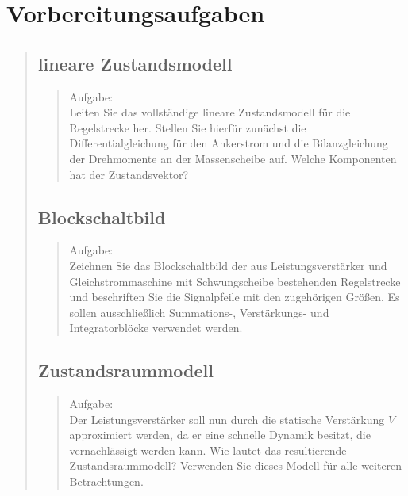 \section{Vorbereitungsaufgaben}
\begin{quote}
	\subsection{lineare Zustandsmodell}
	\begin{quote}
		Aufgabe:\\
		Leiten Sie das vollständige lineare Zustandsmodell für die Regelstrecke her. Stellen Sie hierfür zunächst
		die Differentialgleichung für den Ankerstrom und die Bilanzgleichung der Drehmomente an der Massenscheibe auf. Welche
		Komponenten hat der Zustandsvektor?\\
		
		
        
	\end{quote}
	
	\subsection{Blockschaltbild}
	\begin{quote}
		Aufgabe:\\
		Zeichnen Sie das Blockschaltbild der aus Leistungsverstärker und Gleichstrommaschine mit Schwungscheibe
		bestehenden Regelstrecke und beschriften Sie die Signalpfeile mit den zugehörigen Größen. Es sollen ausschließlich Summations-,
		Verstärkungs- und Integratorblöcke verwendet werden.\\
		
		
		
	\end{quote}
	
	\subsection{Zustandsraummodell}
	\begin{quote}
		Aufgabe:\\
		Der Leistungsverstärker soll nun durch die statische Verstärkung $V$ approximiert werden, da er eine
		schnelle Dynamik besitzt, die vernachlässigt werden kann. Wie lautet das resultierende Zustandsraummodell? Verwenden
		Sie dieses Modell für alle weiteren Betrachtungen.\\
		
		
		
	\end{quote}
	

\end{quote}
